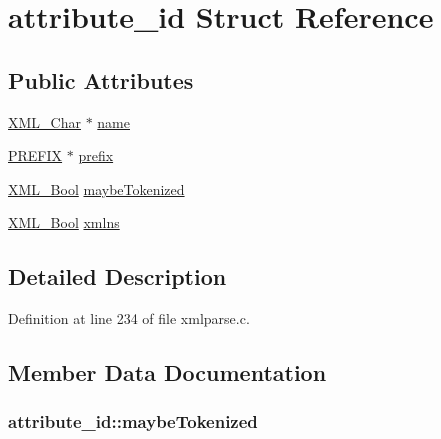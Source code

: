 \hypertarget{structattribute__id}{}\section{attribute\+\_\+id Struct Reference}
\label{structattribute__id}
\subsection*{Public Attributes}
\begin{DoxyCompactItemize}
\item 
\hyperlink{amiga_2include_2libraries_2expat_8h_a63da96463e775e1ec3a7d1f076208127}{X\+M\+L\+\_\+\+Char} $\ast$ \hyperlink{structattribute__id_af8b2fb1a367eada9343d480d68ecbdc2}{name}
\item 
\hyperlink{xmlparse_8c_aa3f98fd58683acd364daca2ddc737491}{P\+R\+E\+F\+IX} $\ast$ \hyperlink{structattribute__id_afb6bec6f1cdd62a46d587cde524ec8f0}{prefix}
\item 
\hyperlink{amiga_2include_2libraries_2expat_8h_a5fe41bca8b7a23b2405f1b967e70f33a}{X\+M\+L\+\_\+\+Bool} \hyperlink{structattribute__id_a872275184a43dd1b7769ce85f65c79ec}{maybe\+Tokenized}
\item 
\hyperlink{amiga_2include_2libraries_2expat_8h_a5fe41bca8b7a23b2405f1b967e70f33a}{X\+M\+L\+\_\+\+Bool} \hyperlink{structattribute__id_a7fd4c7dcbd21d38a1ab2aa3b510a907d}{xmlns}
\end{DoxyCompactItemize}


\subsection{Detailed Description}


Definition at line 234 of file xmlparse.\+c.



\subsection{Member Data Documentation}
\subsubsection[{\texorpdfstring{maybe\+Tokenized}{maybeTokenized}}]{ attribute\+\_\+id\+::maybe\+Tokenized}\hypertarget{structattribute__id_a872275184a43dd1b7769ce85f65c79ec}{}\label{structattribute__id_a872275184a43dd1b7769ce85f65c79ec}


